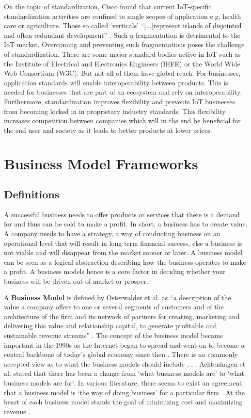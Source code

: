 		On the topic of standardization, Cisco found that current IoT-specific standardization activities are confined to single scopes of application e.g. health care or agriculture. Those so called `verticals' ``[...]represent islands of disjointed and often redundant development'' \cite[p.~18]{cisco}. Such a fragmentation is detrimental to the IoT market. Overcoming and preventing such fragmentations poses the challenge of standardization. There are some major standard bodies active in IoT such as the Institute of Electrical and Electronics Engineers (IEEE) or the World Wide Web Consortium (W3C). But not all of them have global reach. For businesses, application standards will enable interoperability between products. This is needed for businesses that are part of an ecosystem and rely on interoperability. Furthermore, standardization improves flexibility and prevents IoT businesses from becoming locked in in proprietary industry standards. This flexibility increases competition between companies which will in the end be beneficial for the end user and society as it leads to better products at lower prices.
	

\section{Business Model Frameworks}
\label{sec:bmf}	
	\subsection{Definitions} 
		A successful business needs to offer products or services that there is a demand for and thus can be sold to make a profit. In short, a business has to create value. A company needs to have a strategy, a way of conducting business on an operational level that will result in long term financial success, else a business is not viable and will disappear from the market sooner or later.
		A business model can be seen as a logical abstraction describing how the business operates to make a profit. A business models hence is a core factor in deciding whether your business will be driven out of market or prosper.

		A \textbf{Business Model} is defined by Osterwalder et al. as ``a description of the value a company offers to one or several segments of customers and of the architecture of the firm and its network of partners for creating, marketing and delivering this value and relationship capital, to generate profitable and sustainable revenue streams'' \cite{osterwalder2005}. The concept of the business model became important in the 1990s as the Internet began to spread and went on to become a central backbone of today's global economy since then \cite{zott}. There is no commonly accepted view as to what the business models should include \cite{morris}, \cite{osterwalder2005}, \cite{schweizer}. Achtenhagen et al. \cite{achtenhagen} stated that there has been a change from `what business models are' to `what business models are for'. In various literature, there seems to exist an agreement that a business model is `the way of doing business' for a particular firm \cite{westerlund}. At the heart of each business model stands the goal of minimizing cost and maximizing revenue \cite{ju}.
 		

